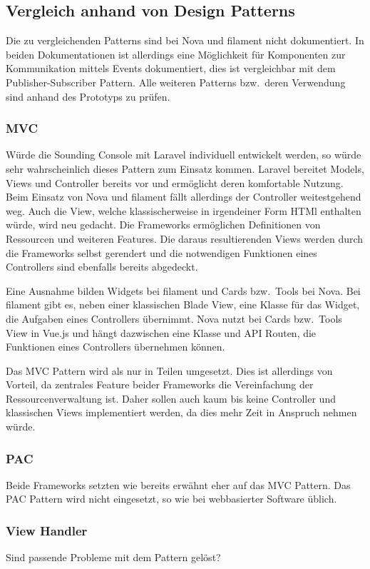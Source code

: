 \subsection{Vergleich anhand von Design Patterns}
Die zu vergleichenden Patterns sind bei Nova und filament nicht dokumentiert.
In beiden Dokumentationen ist allerdings eine Möglichkeit für Komponenten zur Kommunikation mittels Events dokumentiert, dies ist vergleichbar mit dem Publisher-Subscriber Pattern.
Alle weiteren Patterns bzw.\ deren Verwendung sind anhand des Prototyps zu prüfen.

\subsubsection{MVC}
Würde die Sounding Console mit Laravel individuell entwickelt werden, so würde sehr wahrscheinlich dieses Pattern zum Einsatz kommen.
Laravel bereitet Models, Views und Controller bereits vor und ermöglicht deren komfortable Nutzung.
Beim Einsatz von Nova und filament fällt allerdings der Controller weitestgehend weg.
Auch die View, welche klassischerweise in irgendeiner Form HTMl enthalten würde, wird neu gedacht.
Die Frameworks ermöglichen Definitionen von Ressourcen und weiteren Features.
Die daraus resultierenden Views werden durch die Frameworks selbst gerendert und die notwendigen Funktionen eines Controllers sind ebenfalls bereits abgedeckt.

Eine Ausnahme bilden Widgets bei filament und Cards bzw.\ Tools bei Nova.
Bei filament gibt es, neben einer klassischen Blade View, eine Klasse für das Widget, die Aufgaben eines Controllers übernimmt.
Nova nutzt bei Cards bzw.\ Tools View in Vue.js und hängt dazwischen eine Klasse und API Routen, die Funktionen eines Controllers übernehmen können.

Das MVC Pattern wird als nur in Teilen umgesetzt.
Dies ist allerdings von Vorteil, da zentrales Feature beider Frameworks die Vereinfachung der Ressourcenverwaltung ist.
Daher sollen auch kaum bis keine Controller und klassischen Views implementiert werden, da dies mehr Zeit in Anspruch nehmen würde.

\subsubsection{PAC}
Beide Frameworks setzten wie bereits erwähnt eher auf das MVC Pattern.
Das PAC Pattern wird nicht eingesetzt, so wie bei webbasierter Software üblich.

\subsubsection{View Handler}
\color{red}
Sind passende Probleme mit dem Pattern gelöst?
\color{black}

